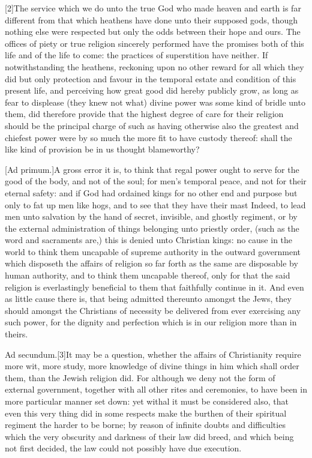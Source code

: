 [2]The service which we do unto the true God who made heaven and earth is far different from that which heathens have done unto their supposed gods, though nothing else were respected but only the odds between their hope and ours. The offices of piety or true religion sincerely performed have the promises both of this life and of the life to come: the practices of superstition have neither. If notwithstanding the heathens, reckoning upon no other reward for all which they did but only protection and favour in the temporal estate and condition of this present life, and perceiving how great good did hereby publicly grow, as long as fear to displease (they knew not what) divine power was some kind of bridle unto them, did therefore provide that the highest degree of care for their religion should be the principal charge of such as having otherwise also the greatest and chiefest power were by so much the more fit to have custody thereof: shall the like kind of provision be in us thought blameworthy?

[Ad primum.]A gross error it is, to think that regal power ought to serve for the good of the body, and not of the soul; for men’s temporal peace, and not for their eternal safety: and if God had ordained kings for no other end and purpose but only to fat up men like hogs, and to see that they have their mast Indeed, to lead men unto salvation by the hand of secret, invisible, and ghostly regiment, or by the external administration of things belonging unto priestly order, (such as the word and sacraments are,) this is denied unto Christian kings: no cause in the world to think them uncapable of supreme authority in the outward government which disposeth the affairs of religion so far forth as the same are disposable by human authority, and to think them uncapable thereof, only for that the said religion is everlastingly beneficial to them that faithfully continue in it. And even as little cause there is, that being admitted thereunto amongst the Jews, they should amongst the Christians of necessity be delivered from ever exercising any such power, for the  dignity and perfection which is in our religion more than in theirs.

Ad secundum.[3]It may be a question, whether the affairs of Christianity require more wit, more study, more knowledge of divine things in him which shall order them, than the Jewish religion did. For although we deny not the form of external government, together with all other rites and ceremonies, to have been in more particular manner set down: yet withal it must be considered also, that even this very thing did in some respects make the burthen of their spiritual regiment the harder to be borne; by reason of infinite doubts and difficulties which the very obscurity and darkness of their law did breed, and which being not first decided, the law could not possibly have due execution.


